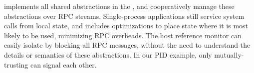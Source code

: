


\sysname{} implements all shared abstractions in the \libos{}, and \liboses{} cooperatively manage these abstractions
over RPC streams.
Single-process applications still service system calls from local state, and \sysname{} 
includes optimizations to place state where it is most likely to be used,
minimizing RPC overheads.
The host reference monitor can easily isolate \liboses{}
by 
blocking all
RPC messages, %
without the need to understand the \libos{} details or semantics of these abstractions.
In our PID example, only mutually-trusting \liboses{} can signal each other.



